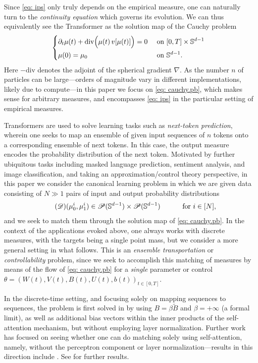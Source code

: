 \documentclass[a4paper,11pt]{article}
\theoremstyle{plain}
\newcommand{\dive}{\mathrm{div}}
\renewcommand{\S}{\mathbb{S}^{d-1}}
\newcommand{\bW}{\bm{\mathit{W}}}
\newcommand{\bV}{\bm{\mathit{V}}}
\newcommand{\bB}{\bm{\mathit{B}}}
\newcommand{\bU}{\bm{\mathit{U}}}
\numberwithin{equation}{section}
\begin{document}
Since \eqref{eq: ips} only truly depends on the empirical measure, one can naturally turn to the \emph{continuity equation} which governs its evolution. We can thus equivalently see the Transformer as the solution map of the Cauchy problem
\begin{equation} \label{eq: cauchy.pb}
\begin{dcases}
\partial_t \mu(t) + \dive\Big(\mu(t)\, v[\mu(t)]\Big)=0 &\text{ on } [0,T]\times\S\\
\mu(0) = \mu_0 &\text{ on } \S.
\end{dcases}
\end{equation}
Here $-\mathrm{div}$ denotes the adjoint of the spherical gradient $\nabla$.
As the number $n$ of particles can be large---orders of magnitude vary in different implementations, likely due to compute---in this paper we focus on \eqref{eq: cauchy.pb}, which makes sense for arbitrary measures, and encompasses \eqref{eq: ips} in the particular setting of empirical measures.

Transformers are used to solve learning tasks such as \emph{next-token prediction}, wherein one seeks to map an ensemble of given input sequences of $n$ tokens onto a corresponding ensemble of  next tokens. In this case, the output measure encodes the probability distribution of the next token. Motivated by further ubiquitous tasks including masked language prediction, sentiment analysis, and image classification, and taking an approximation/control theory perspective, in this paper we consider the canonical learning problem in which we are given data consisting of $N\gg1$ pairs of input and output probability distributions
\begin{equation} \label{eq: data} \tag{$\mathscr{D}$}
(\mu_0^i, \mu_1^i)\in\mathscr{P}(\S)\times\mathscr{P}(\S) \hspace{1cm }\text{ for } i\in[N],
\end{equation}
and we seek to match them through the solution map of \eqref{eq: cauchy.pb}. In the context of the applications evoked above, one always works with discrete measures, with the targets being a single point mass, but we consider a more general setting in what follows.
This is an \emph{ensemble transportation} or \emph{controllability} problem, since we seek to accomplish this matching of measures by means of the flow of \eqref{eq: cauchy.pb} for a \emph{single} parameter or control $\theta=(\bW(t),\bV(t),\bB(t),\bU(t), b(t))_{t\in[0,T]}$. 

In the discrete-time setting, and focusing solely on mapping sequences to sequences, the problem is first solved in \cite{yun2019transformers} by using $\bB=\beta\widetilde{\bB}$ and $\beta=+\infty$ (a formal limit), as well as additional bias vectors within the inner products of the self-attention mechanism, but without employing layer normalization. Further work has focused on seeing whether one can do matching solely using self-attention, namely, without the perceptron component or layer normalization---results in this direction include \cite{alberti2023sumformer, kratsios2021universal}. See \cite{chiang2023tighter, jiang2023approximation, edelman2022inductive, jiang2023brief, wang2024understanding, petrov2024prompting, sander2024towards} for further results. 
\end{document}
